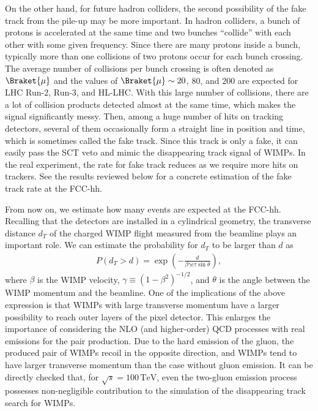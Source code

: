 \documentclass[12pt,twoside,book]{article}
\begin{document}
On the other hand, for future hadron colliders, the second possibility of the fake track from the pile-up may be more important.
In hadron colliders, a bunch of protons is accelerated at the same time and two bunches ``collide'' with each other with some given frequency.
Since there are many protons inside a bunch, typically more than one collisions of two protons occur for each bunch crossing.
The average number of collisions per bunch crossing is often denoted as $\Braket{\mu}$ and the values of $\Braket{\mu} \sim 20$, $80$, and $200$ are expected for LHC Run-2, Run-3, and HL-LHC.
With this large number of collisions, there are a lot of collision products detected almost at the same time, which makes the signal significantly messy.
Then, among a huge number of hits on tracking detectors, several of them occasionally form a straight line in position and time, which is sometimes called the fake track.
Since this track is only a fake, it can easily pass the SCT veto and mimic the disappearing track signal of WIMPs.
In the real experiment, the rate for fake track reduces as we require more hits on trackers.
See the results reviewed below for a concrete estimation of the fake track rate at the FCC-hh.

From now on, we estimate how many events are expected at the FCC-hh.
Recalling that the detectors are installed in a cylindrical geometry, the transverse distance $d_T$ of the charged WIMP flight measured from the beamline plays an important role.
We can estimate the probability for $d_T$ to be larger than $d$ as
\begin{align}
  P(d_T > d) = \exp \left( -\frac{d}{\beta \gamma c \tau \sin\theta} \right),
  \label{eq:survival_probability}
\end{align}
where $\beta$ is the WIMP velocity, $\gamma \equiv (1-\beta^2)^{-1/2}$, and $\theta$ is the angle between the WIMP momentum and the beamline.
One of the implications of the above expression is that WIMPs with large transverse momentum have a larger possibility to reach outer layers of the pixel detector.
This enlarges the importance of considering the NLO (and higher-order) QCD processes with real emissions for the pair production.
Due to the hard emission of the gluon, the produced pair of WIMPs recoil in the opposite direction, and WIMPs tend to have larger transverse momentum than the case without gluon emission.
It can be directly checked that, for $\sqrt{s}=100\,\mathrm{TeV}$, even the two-gluon emission process possesses non-negligible contribution to the simulation of the disappearing track search for WIMPs.
\end{document}
